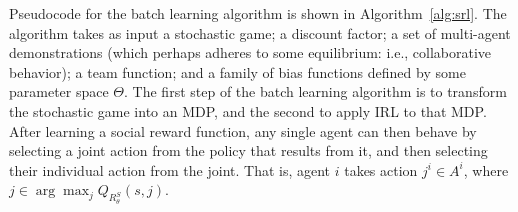 Pseudocode for the batch learning algorithm is shown in Algorithm~\ref{alg:srl}.
%
The algorithm takes as input a stochastic game; a discount factor; a
set of multi-agent demonstrations (which perhaps adheres to some
equilibrium: i.e., collaborative behavior); a team function; and a
family of bias functions defined by some parameter space $\Theta$.
%
The first step of the batch learning algorithm is to transform the
stochastic game into an MDP, and the second to apply IRL to that MDP.
After learning a social reward function, any single agent can then
behave by selecting a joint action from the policy that results from
it, and then selecting their individual action from the joint. That
is, agent $i$ takes action $j^i \in A^i$, where 
$j \in \arg \max_j Q_{R^S_\theta}(s, j)$.


